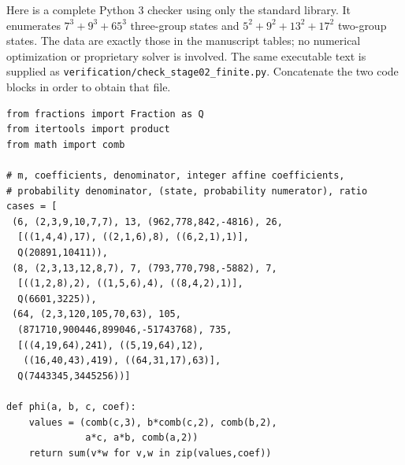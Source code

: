 \newpage
Here is a complete Python 3 checker using only the standard library.
It enumerates $7^3+9^3+65^3$ three-group states and
$5^2+9^2+13^2+17^2$ two-group
states. The data are exactly those in the manuscript tables; no numerical
optimization or proprietary solver is involved. The same executable text
is supplied as \texttt{verification/check\_stage02\_finite.py}.
Concatenate the two code blocks in order to obtain that file.
\par\medskip\noindent\begin{minipage}{\textwidth}\small
\begin{verbatim}
from fractions import Fraction as Q
from itertools import product
from math import comb

# m, coefficients, denominator, integer affine coefficients,
# probability denominator, (state, probability numerator), ratio
cases = [
 (6, (2,3,9,10,7,7), 13, (962,778,842,-4816), 26,
  [((1,4,4),17), ((2,1,6),8), ((6,2,1),1)],
  Q(20891,10411)),
 (8, (2,3,13,12,8,7), 7, (793,770,798,-5882), 7,
  [((1,2,8),2), ((1,5,6),4), ((8,4,2),1)],
  Q(6601,3225)),
 (64, (2,3,120,105,70,63), 105,
  (871710,900446,899046,-51743768), 735,
  [((4,19,64),241), ((5,19,64),12),
   ((16,40,43),419), ((64,31,17),63)],
  Q(7443345,3445256))]

def phi(a, b, c, coef):
    values = (comb(c,3), b*comb(c,2), comb(b,2),
              a*c, a*b, comb(a,2))
    return sum(v*w for v,w in zip(values,coef))

\end{verbatim}
\end{minipage}
\newpage

